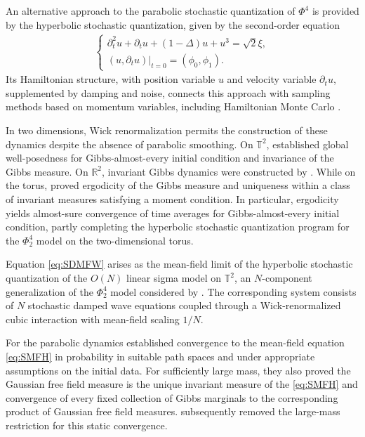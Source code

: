 An alternative approach to the parabolic stochastic quantization of $\Phi^4$ is provided by the hyperbolic stochastic quantization, given by the second-order equation
\begin{align}\label{eq:SNLDW_unrenormalized}
\begin{cases}
\partial_t^2 u+\partial_t u+(1-\Delta)u+u^3=\sqrt{2}\xi,\\
(u,\partial_t u)|_{t=0}=(\phi_0,\phi_1).
\end{cases}
\end{align}
Its Hamiltonian structure, with position variable $u$ and velocity variable $\partial_t u$, supplemented by damping and noise, connects this approach with sampling methods based on momentum variables, including Hamiltonian Monte Carlo \cite{DuaneEtAl1987}.

In two dimensions, Wick renormalization permits the construction of these dynamics despite the absence of parabolic smoothing.
On $\mathbb{T}^2$, \cite{GKOT2022} established global well-posedness for Gibbs-almost-every initial condition and invariance of the Gibbs measure. On $\mathbb{R}^2$, invariant Gibbs dynamics were constructed by \cite{OTWZ2026}. While on the torus, \cite{Tolomeo2023Ergodicity} proved ergodicity of the Gibbs measure and uniqueness within a class of invariant measures satisfying a moment condition. In particular, ergodicity yields almost-sure convergence of time averages for Gibbs-almost-every initial condition, partly completing the hyperbolic stochastic quantization program for the $\Phi^4_2$ model on the two-dimensional torus. 



Equation \eqref{eq:SDMFW} arises as the mean-field limit of the hyperbolic stochastic quantization of the $O(N)$ linear sigma model on $\mathbb{T}^2$, an $N$-component generalization of the $\Phi^4_2$ model considered by \cite{Wilson1973}. The corresponding system consists of $N$ stochastic damped wave equations coupled through a Wick-renormalized cubic interaction with mean-field scaling $1/N$.

For the parabolic dynamics \cite{Shen2022} established convergence to the mean-field equation \eqref{eq:SMFH} in probability in suitable path spaces and under appropriate assumptions on the initial data. For sufficiently large mass, they also proved the Gaussian free field measure is the unique invariant measure of the \eqref{eq:SMFH} and convergence of every fixed collection of Gibbs marginals to the corresponding product of Gaussian free field measures. \cite{DelgadinoSmith2026} subsequently removed the large-mass restriction for this static convergence.

